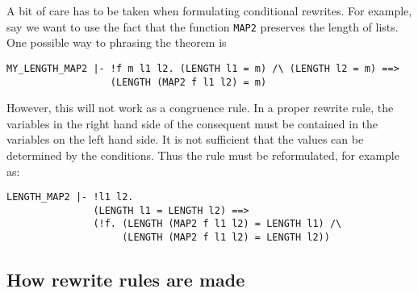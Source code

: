 A bit of care has to be taken when formulating conditional rewrites.
For example, say we want to use the fact that the function {\tt MAP2}
preserves the length of lists. One possible way to phrasing the
theorem is
\begin{hol} \begin{verbatim}
MY_LENGTH_MAP2 |- !f m l1 l2. (LENGTH l1 = m) /\ (LENGTH l2 = m) ==>
                  (LENGTH (MAP2 f l1 l2) = m)
\end{verbatim} \end{hol}

However, this will not work as a congruence rule. In a proper rewrite
rule, the variables in the right hand side of the consequent must be
contained in the variables on the left hand side. It is not sufficient
that the values can be determined by the conditions. Thus the rule
must be reformulated, for example as:
\begin{hol} \begin{verbatim}
LENGTH_MAP2 |- !l1 l2.
               (LENGTH l1 = LENGTH l2) ==>
               (!f. (LENGTH (MAP2 f l1 l2) = LENGTH l1) /\
                    (LENGTH (MAP2 f l1 l2) = LENGTH l2))
\end{verbatim} \end{hol}


\subsection{How rewrite rules are made}

